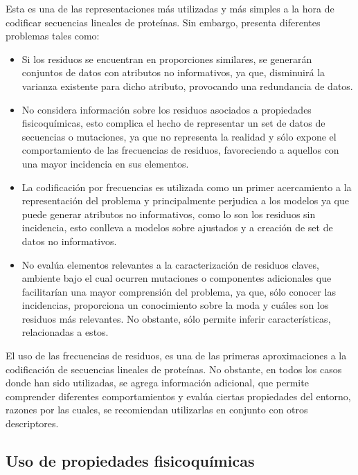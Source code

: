 Esta es una de las representaciones más utilizadas y más simples a la hora de codificar secuencias lineales de proteínas. Sin embargo, presenta diferentes problemas tales como:

\begin{itemize}
	
	\item Si los residuos se encuentran en proporciones similares, se generarán conjuntos de datos con atributos no informativos, ya que, disminuirá la varianza existente para dicho atributo, provocando una redundancia de datos.
	
	\item No considera información sobre los residuos asociados a propiedades fisicoquímicas, esto complica el hecho de representar un set de datos de secuencias o mutaciones, ya que no representa la realidad y sólo expone el comportamiento de las frecuencias de residuos, favoreciendo a aquellos con una mayor incidencia en sus elementos.
	
	\item La codificación por frecuencias es utilizada como un primer acercamiento a la representación del problema y principalmente perjudica a los modelos ya que puede generar atributos no informativos, como lo son los residuos sin incidencia, esto conlleva a modelos sobre ajustados y a creación de set de datos no informativos.
	
	\item No evalúa elementos relevantes a la caracterización de residuos claves, ambiente bajo el cual ocurren mutaciones o componentes adicionales que facilitarían una mayor comprensión del problema, ya que, sólo conocer las incidencias, proporciona un conocimiento sobre la moda y cuáles son los residuos más relevantes. No obstante, sólo permite inferir características, relacionadas a estos.
\end{itemize}

El uso de las frecuencias de residuos, es una de las primeras aproximaciones a la codificación de secuencias lineales de proteínas. No obstante, en todos los casos donde han sido utilizadas, se agrega información adicional, que permite comprender diferentes comportamientos y evalúa ciertas propiedades del entorno, razones por las cuales, se recomiendan utilizarlas en conjunto con otros descriptores. 

\subsection{Uso de propiedades fisicoquímicas}

